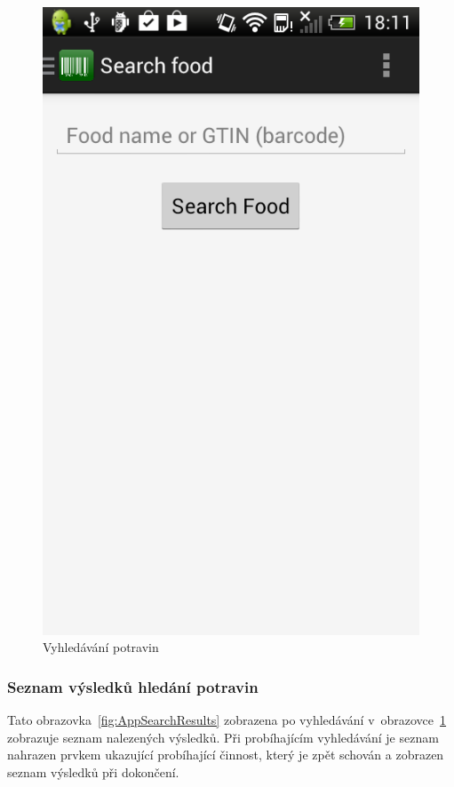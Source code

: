 \documentclass[thesis=B,czech]{FITthesis}[2013/10/20]
\begin{document}
\begin{figure}[H]
  \centering
  \includegraphics[scale=0.4]{screenshots/app_search.png}
  \caption{Vyhledávání potravin}
  \label{fig:AppSearch}
\end{figure}

\clearpage

\subsubsection{Seznam výsledků hledání potravin}

Tato obrazovka~\ref{fig:AppSearchResults} zobrazena po vyhledávání v~obrazovce~\ref{fig:AppSearch} zobrazuje seznam nalezených výsledků. Při probíhajícím vyhledávání je seznam nahrazen prvkem ukazující probíhající činnost, který je zpět schován a zobrazen seznam výsledků při dokončení.
\end{document}
